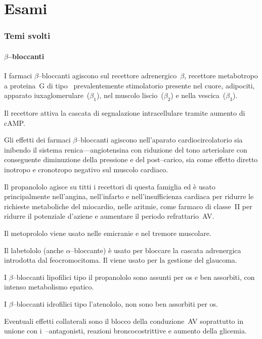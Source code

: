 \part{Esami}
\section{Temi svolti}

\subsection{$\beta$--bloccanti}

I farmaci $\beta$--bloccanti agiscono sul recettore adrenergico~$\beta$, recettore metabotropo a proteina~G di tipo~ prevalentemente stimolatorio presente nel cuore, adipociti, apparato iuxaglomerulare~($\beta_1$), nel muscolo liscio~($\beta_2$) e nella vescica~($\beta_3$).

Il recettore attiva la cascata di segnalazione intracellulare tramite aumento di cAMP.

Gli effetti dei farmaci $\beta$--bloccanti agiscono nell'aparato cardiocircolatorio sia inibendo il sistema renica---angiotensina con riduzione del tono arteriolare con conseguente diminuzione della pressione e del post--carico, sia come effetto diretto inotropo e cronotropo negativo sul muscolo cardiaco.

Il propanololo agisce su titti i recettori di questa famiglia ed è usato principalmente nell'angina, nell'infarto e nell'insufficienza cardiaca per ridurre le richieste metaboliche del miocardio, nelle aritmie, come farmaco di classe~II per ridurre il potenziale d'aziene e aumentare il periodo refrattario~AV.

Il metoprololo viene usato nelle emicranie e nel tremore muscolare.

Il labetololo (anche $\alpha$--bloccante) è usato per bloccare la cascata adrenergica introdotta dal feocromocitoma. Il  viene usato per la gestione del glaucoma.

I $\beta$--bloccanti lipofilici tipo il propanololo sono assunti per os e ben assorbiti, con intenso metabolismo epatico.

I $\beta$--bloccanti idrofilici tipo l'atenololo, non sono ben assorbiti per os. 

Eventuali effetti collaterali sono il blocco della conduzione~AV soprattutto in unione con i~--antagonisti, reazioni broncocostrittive e aumento della glicemia.

